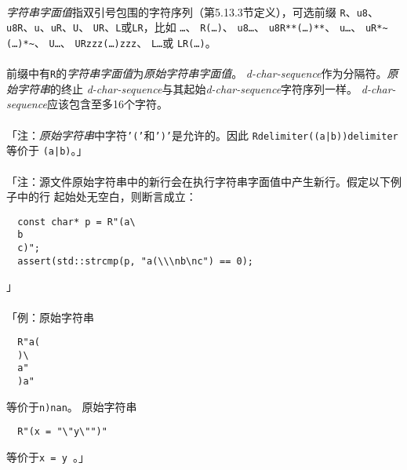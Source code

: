 \paragraph{}
\textit{字符串字面值}指双引号包围的字符序列（第5.13.3节定义），可选前缀
\texttt{R}、\texttt{u8}、\texttt{u8R}、\texttt{u}、\texttt{uR}、\texttt{U}、
\texttt{UR}、\texttt{L}或\texttt{LR}，比如
\texttt{\qdbl{}\ldots\qdbl}、
\texttt{R\qdbl{}(\ldots)\qdbl}、
\texttt{u8\qdbl{}\ldots\qdbl}、
\texttt{u8R\qdbl{}**(\ldots)**\qdbl}、
\texttt{u\qdbl{}\ldots\qdbl}、
\texttt{uR\qdbl{}*\textasciitilde(\ldots)*\textasciitilde\qdbl}、
\texttt{U\qdbl{}\ldots\qdbl}、
\texttt{UR\qdbl{}zzz(\ldots)zzz\qdbl}、
\texttt{L\qdbl{}\ldots\qdbl}或
\texttt{LR\qdbl{}(\ldots)\qdbl}。

\paragraph{}
前缀中有\texttt{R}的\textit{字符串字面值}为\textit{原始字符串字面值}。
\textit{d-char-sequence}作为分隔符。\textit{原始字符串}的终止
\textit{d-char-sequence}与其起始\textit{d-char-sequence}字符序列一样。
\textit{d-char-sequence}应该包含至多16个字符。

\paragraph{}
「注：\textit{原始字符串}中字符\texttt{'('}和\texttt{')'}是允许的。因此
\texttt{R\qdbl{}delimiter((a|b))delimiter\qdbl}等价于
\texttt{\qdbl{}(a|b)\qdbl}。」

\paragraph{}
「注：源文件原始字符串中的新行会在执行字符串字面值中产生新行。假定以下例子中的行
起始处无空白，则断言成立：
\begin{lstlisting}
  const char* p = R"(a\
  b
  c)";
  assert(std::strcmp(p, "a(\\\nb\nc") == 0);
\end{lstlisting}」

\paragraph{}
「例：原始字符串
\begin{lstlisting}
  R"a(
  )\
  a"
  )a"
\end{lstlisting}
等价于\texttt{\qdbl\bslh n)\bslh\bslh\bslh na\bslh\qdbl\bslh n\qdbl}。
原始字符串
\begin{lstlisting}
  R"(x = "\"y\"")"
\end{lstlisting}
等价于\texttt{\qdbl x = \bslh\qdbl\bslh\bslh\bslh\qdbl y\bslh\bslh\bslh\qdbl
\bslh\qdbl\qdbl}。」

